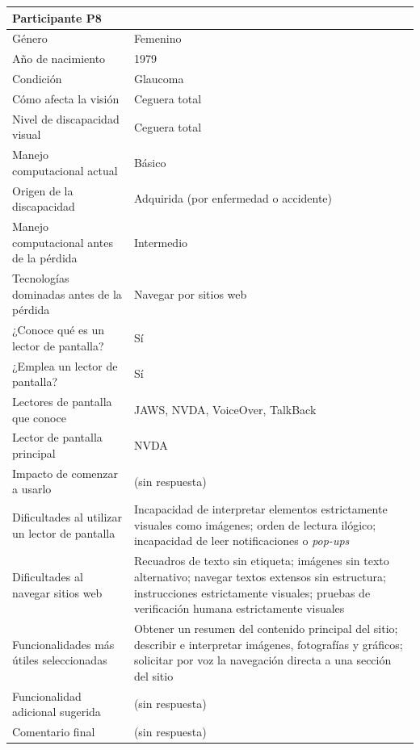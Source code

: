 \begin{longtable}{|p{4cm}|p{10.5cm}|}
    \multicolumn{2}{|l|}{\textbf{Participante P8}} \\
    \hline
    Género & Femenino \\
    \hline
    Año de nacimiento & 1979 \\
    \hline
    Condición & Glaucoma \\
    \hline
    Cómo afecta la visión & Ceguera total \\
    \hline
    Nivel de discapacidad visual & Ceguera total \\
    \hline
    Manejo computacional actual & Básico \\
    \hline
    Origen de la discapacidad & Adquirida (por enfermedad o accidente) \\
    \hline
    Manejo computacional antes de la pérdida & Intermedio \\
    \hline
    Tecnologías dominadas antes de la pérdida & Navegar por sitios web \\
    \hline
    ¿Conoce qué es un lector de pantalla? & Sí \\
    \hline
    ¿Emplea un lector de pantalla? & Sí \\
    \hline
    Lectores de pantalla que conoce & JAWS, NVDA, VoiceOver, TalkBack \\
    \hline
    Lector de pantalla principal & NVDA \\
    \hline
    Impacto de comenzar a usarlo & (sin respuesta) \\
    \hline
    Dificultades al utilizar un lector de pantalla & Incapacidad de interpretar elementos estrictamente visuales como imágenes; orden de lectura ilógico; incapacidad de leer notificaciones o \textit{pop-ups} \\
    \hline
    Dificultades al navegar sitios web & Recuadros de texto sin etiqueta; imágenes sin texto alternativo; navegar textos extensos sin estructura; instrucciones estrictamente visuales; pruebas de verificación humana estrictamente visuales \\
    \hline
    Funcionalidades más útiles seleccionadas & Obtener un resumen del contenido principal del sitio; describir e interpretar imágenes, fotografías y gráficos; solicitar por voz la navegación directa a una sección del sitio \\
    \hline
    Funcionalidad adicional sugerida & (sin respuesta) \\
    \hline
    Comentario final & (sin respuesta) \\
    \hline


\end{longtable}
